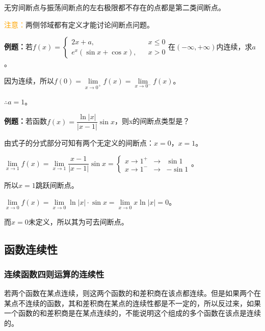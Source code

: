 \documentclass[UTF8, 12pt]{ctexart}
\begin{document}

无穷间断点与振荡间断点的左右极限都不存在的点都是第二类间断点。

\textcolor{orange}{注意：}两侧邻域都有定义才能讨论间断点问题。\medskip

\textbf{例题：}若$f(x)=\left\{
    \begin{array}{lcl}
        2x+a, & & x\leqslant 0 \\
        e^x(\sin x+\cos x), & & x>0
    \end{array} \right.
$在$(-\infty,+\infty)$内连续，求$a$。

因为连续，所以$f(0)=\lim\limits_{x\to 0^+}f(x)=\lim\limits_{x\to 0^-}f(x)$。

$\therefore a=1$。

\textbf{例题：}若函数$f(x)=\dfrac{\ln\vert x\vert}{\vert x-1\vert}\sin x$，则x的间断点类型是？\medskip

由式子的分式部分可知有两个无定义的间断点：$x=0$，$x=1$。\medskip

$\lim\limits_{x\to 1}f(x)=\lim\limits_{x\to 1}\dfrac{x-1}{\vert x-1\vert}\sin x=\left\{
    \begin{array}{lcl}
        x\to 1^+ & \rightarrow & \sin 1 \\
        x\to 1^- & \rightarrow & -\sin 1
    \end{array} \right.
$。

所以$x=1$跳跃间断点。

$\lim\limits_{x\to 0}f(x)=\lim\limits_{x\to 0}\ln\vert x\vert\cdot\sin x=\lim\limits_{x\to 0}x\ln\vert x\vert=0$。

而$x=0$未定义，所以其为可去间断点。

\subsection{函数连续性}

\subsubsection{连续函数四则运算的连续性}

若两个函数在某点连续，则这两个函数的和差积商在该点都连续。但是如果两个在某点不连续的函数，其和差积商在某点的连续性都是不一定的，所以反过来，如果一个函数的和差积商是在某点连续的，不能说明这个组成的多个函数在该点是连续的。
\end{document}
